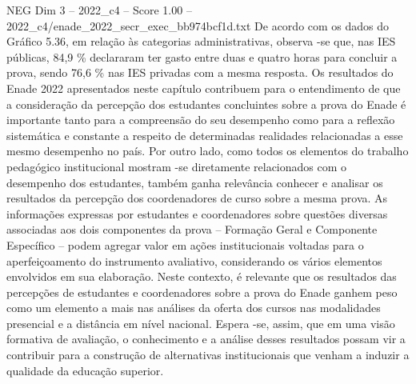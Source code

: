 \begin{textsample}{NEG Dim 3 – 2022\_c4 – Score 1.00 – 2022\_c4/enade\_2022\_secr\_exec\_bb974bcf1d.txt}
De acordo com os dados do Gráfico 5.36, em relação às categorias administrativas, observa -se que, nas IES públicas, 84,9 \% declararam ter gasto entre duas e quatro horas para concluir a prova, sendo 76,6 \% nas IES privadas com a mesma resposta.
Os resultados do Enade 2022 apresentados neste capítulo contribuem para o entendimento de que a consideração da percepção dos estudantes concluintes sobre a prova do Enade é importante tanto para a compreensão do seu desempenho como para a reflexão sistemática e constante a respeito de determinadas realidades relacionadas a esse mesmo desempenho no país.
Por outro lado, como todos os elementos do trabalho pedagógico institucional mostram -se diretamente relacionados com o desempenho dos estudantes, também ganha relevância conhecer e analisar os resultados da percepção dos coordenadores de curso sobre a mesma prova.
As informações expressas por estudantes e coordenadores sobre questões diversas associadas aos dois componentes da prova – Formação Geral e Componente Específico – podem agregar valor em ações institucionais voltadas para o aperfeiçoamento do instrumento avaliativo, considerando os vários elementos envolvidos em sua elaboração.
Neste contexto, é relevante que os resultados das percepções de estudantes e coordenadores sobre a prova do Enade ganhem peso como um elemento a mais nas análises da oferta dos cursos nas modalidades presencial e a distância em nível nacional.
Espera -se, assim, que em uma visão formativa de avaliação, o conhecimento e a análise desses resultados possam vir a contribuir para a construção de alternativas institucionais que venham a induzir a qualidade da educação superior.

\end{textsample}
